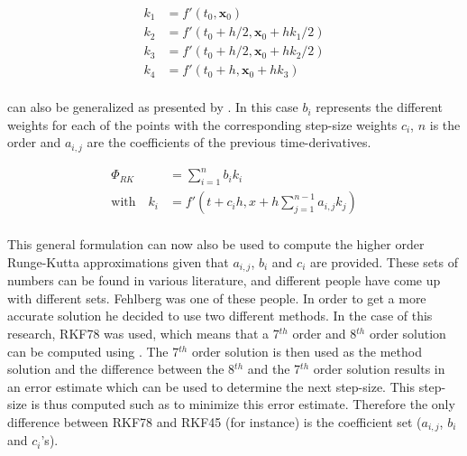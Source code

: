 \begin{equation} \label{eq:k}
\begin{split}
k_{1}&=f'\left(t_{0},\mathbf{x}_{0}\right)\\
k_{2}&=f'\left(t_{0}+h/2,\mathbf{x}_{0}+hk_{1}/2\right)\\
k_{3}&=f'\left(t_{0}+h/2,\mathbf{x}_{0}+hk_{2}/2\right)\\
k_{4}&=f'\left(t_{0}+h,\mathbf{x}_{0}+hk_{3}\right)\\
\end{split}
\end{equation}


\noindent
{} can also be generalized as presented by . In this case $b_{i}$ represents the different weights for each of the points with the corresponding step-size weights $c_{i}$, $n$ is the order and $a_{i,j}$ are the coefficients of the previous time-derivatives.

\begin{equation} \label{eq:generalRK}
\begin{split}
\Phi_{RK} &= \displaystyle \sum^{n}_{i=1}b_{i}k_{i} \\
\text{with}\quad k_{i} &= f'\left(t+c_{i}h,x+h\displaystyle \sum^{n-1}_{j=1}a_{i,j}k_{j} \right) \\
\end{split}
\end{equation}


\noindent
This general formulation can now also be used to compute the higher order Runge-Kutta approximations given that $a_{i,j}$, $b_{i}$ and $c_{i}$ are provided. These sets of numbers can be found in various literature, and different people have come up with different sets. Fehlberg was one of these people. In order to get a more accurate solution he decided to use two different methods. In the case of this research, \ac{RKF78} was used, which means that a 7$^{th}$ order and 8$^{th}$ order solution can be computed using . The 7$^{th}$ order solution is then used as the method solution and the difference between the 8$^{th}$ and the 7$^{th}$ order solution results in an error estimate which can be used to determine the next step-size. This step-size is thus computed such as to minimize this error estimate. Therefore the only difference between \ac{RKF78} and \ac{RKF45} (for instance) is the coefficient set ($a_{i,j}$, $b_{i}$ and $c_{i}$'s). 









